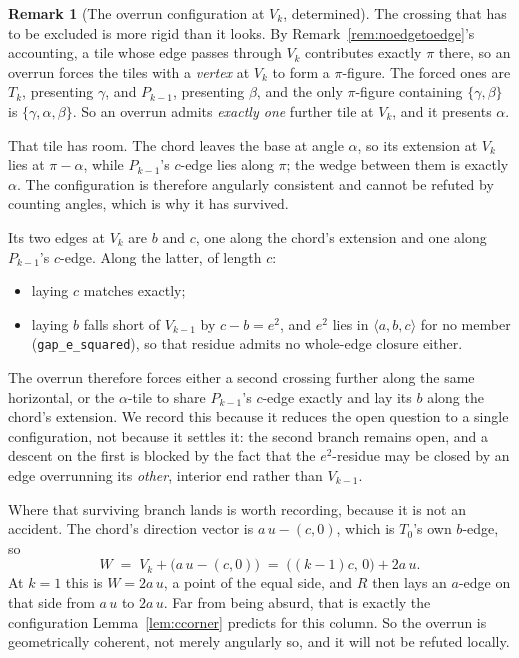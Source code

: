 \documentclass[11pt,reqno]{amsart}
\theoremstyle{plain}
\theoremstyle{definition}
\newtheorem{remark}[theorem]{Remark}
\begin{document}
\begin{remark}[The overrun configuration at $V_k$, determined]\label{rem:overrunshape}
The crossing that has to be excluded is more rigid than it looks. By
Remark~\ref{rem:noedgetoedge}'s accounting, a tile whose edge passes through $V_k$ contributes
exactly $\pi$ there, so an overrun forces the tiles with a \emph{vertex} at $V_k$ to form a
$\pi$-figure. The forced ones are $T_k$, presenting $\gamma$, and $P_{k-1}$, presenting $\beta$, and
the only $\pi$-figure containing $\{\gamma,\beta\}$ is $\{\gamma,\alpha,\beta\}$. So an overrun
admits \emph{exactly one} further tile at $V_k$, and it presents $\alpha$.

That tile has room. The chord leaves the base at angle $\alpha$, so its extension at $V_k$ lies at
$\pi-\alpha$, while $P_{k-1}$'s $c$-edge lies along $\pi$; the wedge between them is exactly
$\alpha$. The configuration is therefore angularly consistent and cannot be refuted by counting
angles, which is why it has survived.

Its two edges at $V_k$ are $b$ and $c$, one along the chord's extension and one along $P_{k-1}$'s
$c$-edge. Along the latter, of length $c$:
\begin{itemize}
\item laying $c$ matches exactly;
\item laying $b$ falls short of $V_{k-1}$ by $c-b=e^2$, and $e^2$ lies in $\langle a,b,c\rangle$ for
no member (\texttt{gap\_e\_squared}), so that residue admits no whole-edge closure either.
\end{itemize}
The overrun therefore forces either a second crossing further along the same horizontal, or the
$\alpha$-tile to share $P_{k-1}$'s $c$-edge exactly and lay its $b$ along the chord's extension. We
record this because it reduces the open question to a single configuration, not because it settles
it: the second branch remains open, and a descent on the first is blocked by the fact that the
$e^2$-residue may be closed by an edge overrunning its \emph{other}, interior end rather than
$V_{k-1}$.

Where that surviving branch lands is worth recording, because it is not an accident. The chord's
direction vector is $a\,u-(c,0)$, which is $T_0$'s own $b$-edge, so
\[
W \;=\; V_k+\bigl(a\,u-(c,0)\bigr) \;=\; \bigl((k-1)c,\,0\bigr)+2a\,u .
\]
At $k=1$ this is $W=2a\,u$, a point of the equal side, and $R$ then lays an $a$-edge on that side
from $a\,u$ to $2a\,u$. Far from being absurd, that is exactly the configuration
Lemma~\ref{lem:ccorner} predicts for this column. So the overrun is geometrically coherent, not
merely angularly so, and it will not be refuted locally.
\end{remark}
\end{document}
